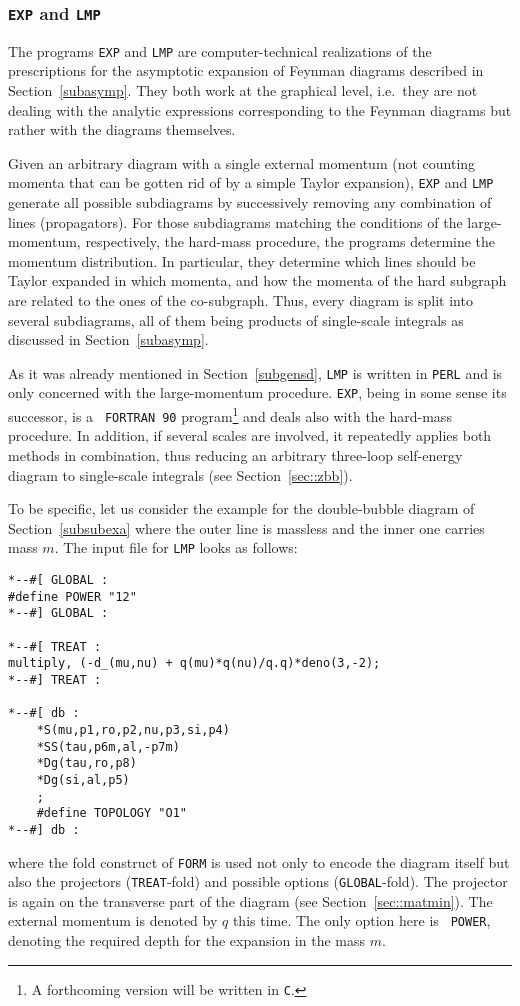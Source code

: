 
\subsubsection{\label{subsubexplmp}{\tt EXP} and {\tt LMP}}
%
The programs {\tt EXP} and {\tt LMP} are computer-technical realizations
of the prescriptions for the asymptotic expansion of Feynman
diagrams described in Section~\ref{subasymp}.
They both work at the graphical level, i.e.~they are not
dealing with the analytic expressions corresponding to the Feynman
diagrams but rather with the diagrams themselves. 

Given an arbitrary diagram with a single external momentum (not counting
momenta that can be gotten rid of by a simple Taylor expansion), {\tt EXP}
and {\tt LMP} generate all possible subdiagrams by successively removing
any combination of lines (propagators). For those subdiagrams matching
the conditions of the large-momentum, respectively, the hard-mass
procedure, the programs determine the momentum distribution. In
particular, they determine which lines should be Taylor expanded in
which momenta, and how the momenta of the hard subgraph are related to
the ones of the co-subgraph. Thus, every diagram is split into
several subdiagrams, all of them being products of single-scale
integrals as discussed in Section~\ref{subasymp}.

As it was already mentioned in Section~\ref{subgensd}, {\tt LMP} is
written in {\tt PERL} and is only concerned with the large-momentum
procedure. {\tt EXP}, being in some sense its successor, is a {\tt
  FORTRAN~90} program\footnote{A forthcoming version will be written in
  {\tt C}.} and deals also with the hard-mass procedure. In addition, if
several scales are involved, it repeatedly applies both methods in
combination, thus reducing an arbitrary three-loop self-energy diagram
to single-scale integrals (see Section~\ref{sec::zbb}).

To be specific, let us consider the example for the double-bubble diagram
of Section~\ref{subsubexa} where the outer line is massless and the inner one
carries mass $m$. The input file for {\tt LMP} looks as follows:
\begin{verbatim}
*--#[ GLOBAL :
#define POWER "12"
*--#] GLOBAL :

*--#[ TREAT :
multiply, (-d_(mu,nu) + q(mu)*q(nu)/q.q)*deno(3,-2);
*--#] TREAT :

*--#[ db :
    *S(mu,p1,ro,p2,nu,p3,si,p4)
    *SS(tau,p6m,al,-p7m)
    *Dg(tau,ro,p8)
    *Dg(si,al,p5)
    ;
    #define TOPOLOGY "O1"
*--#] db :
\end{verbatim}
where the fold construct of {\tt FORM} is used not only to encode the
diagram itself but also the projectors ({\tt TREAT}-fold) and possible
options ({\tt GLOBAL}-fold). The projector is again on the transverse
part of the diagram (see Section~\ref{sec::matmin}).  The external
momentum is denoted by $q$ this time.  The only option here is {\tt
  POWER}, denoting the required depth for the expansion in the mass $m$.

